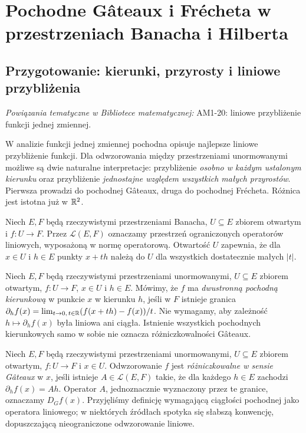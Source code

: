 
\section{Pochodne Gâteaux i Frécheta w przestrzeniach Banacha i Hilberta}
\label{sec:gateaux-frechet14}

\providecommand{\atlasref}[2]{#2}


\subsection{Przygotowanie: kierunki, przyrosty i liniowe przybliżenia}

\noindent\emph{Powiązania tematyczne w Bibliotece matematycznej:} \atlasref{AM1-20::ma1:thm:linear-approximation}{AM1-20: liniowe przybliżenie funkcji jednej zmiennej}.


W analizie funkcji jednej zmiennej pochodna opisuje najlepsze liniowe przybliżenie funkcji. Dla odwzorowania między przestrzeniami unormowanymi możliwe są dwie naturalne interpretacje: przybliżenie \emph{osobno w każdym ustalonym kierunku} oraz przybliżenie \emph{jednostajne względem wszystkich małych przyrostów}. Pierwsza prowadzi do pochodnej Gâteaux, druga do pochodnej Frécheta. Różnica jest istotna już w $\mathbb R^2$.

Niech $E,F$ będą rzeczywistymi przestrzeniami Banacha, $U\subseteq E$ zbiorem otwartym i $f:U\to F$. Przez $\mathcal L(E,F)$ oznaczamy przestrzeń ograniczonych operatorów liniowych, wyposażoną w normę operatorową. Otwartość $U$ zapewnia, że dla $x\in U$ i $h\in E$ punkty $x+th$ należą do $U$ dla wszystkich dostatecznie małych $|t|$.

\begin{definicja}
\label{def:directional14}
Niech $E,F$ będą rzeczywistymi przestrzeniami unormowanymi,
$U\subseteq E$ zbiorem otwartym, $f:U\to F$, $x\in U$ i $h\in E$.
Mówimy, że $f$ ma \emph{dwustronną pochodną kierunkową} w punkcie $x$ w kierunku $h$, jeśli w $F$ istnieje granica
$\partial_h f(x)=\lim_{t\to0,\,t\in\mathbb R}(f(x+th)-f(x))/t$.
Nie wymagamy, aby zależność $h\mapsto\partial_h f(x)$ była liniowa ani ciągła. Istnienie wszystkich pochodnych kierunkowych samo w sobie nie oznacza różniczkowalności Gâteaux.
\end{definicja}

\begin{definicja}
\label{def:gateaux14}
Niech $E,F$ będą rzeczywistymi przestrzeniami unormowanymi,
$U\subseteq E$ zbiorem otwartym, $f:U\to F$ i $x\in U$.
Odwzorowanie $f$ jest \emph{różniczkowalne w sensie Gâteaux} w $x$, jeśli istnieje $A\in\mathcal L(E,F)$ takie, że dla każdego $h\in E$ zachodzi $\partial_h f(x)=Ah$. Operator $A$, jednoznacznie wyznaczony przez te granice, oznaczamy $D_Gf(x)$. Przyjęliśmy definicję wymagającą ciągłości pochodnej jako operatora liniowego; w niektórych źródłach spotyka się słabszą konwencję, dopuszczającą nieograniczone odwzorowanie liniowe.
\end{definicja}

